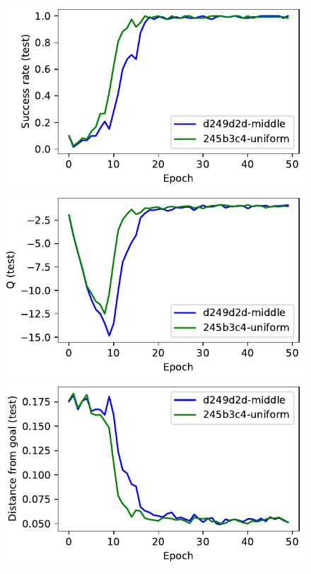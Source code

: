 %
\begin{figure}%
  \def\frac{0.24}
  \includegraphics[width=\frac\columnwidth]{media/res/d249d2d-c9bfa98b-FetchPush-v1-fwrl-future/test/success_rate.pdf}%
  \includegraphics[width=\frac\columnwidth]{media/res/d249d2d-c9bfa98b-FetchPush-v1-fwrl-future/test/mean_Q.pdf}%
  \includegraphics[width=\frac\columnwidth]{media/res/d249d2d-c9bfa98b-FetchPush-v1-fwrl-future/test/ag_g_dist.pdf}%

\end{figure}
